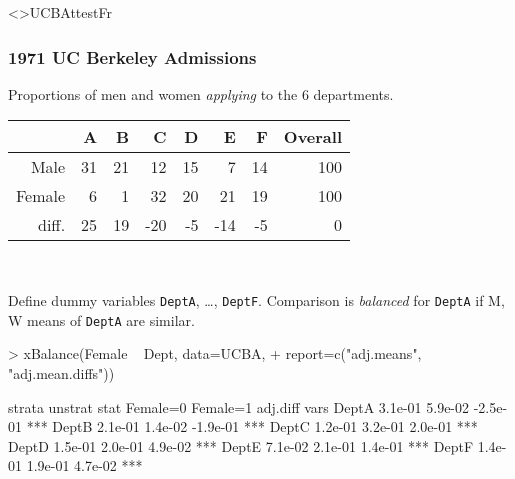 \againframe<\nottheirhandout>{UCBAttestFr}

\begin{frame}[fragile] 
  \frametitle{1971 UC Berkeley Admissions}

\bigskip

Proportions of men and women \textit{applying} to the 6 departments.\\
\begin{tabular}{rrrrrrrr}
  \hline
 & A & B & C & D & E & F & Overall \\ 
  \hline
Male & 31 & 21 & 12 & 15 & 7 & 14 & 100 \\ 
  Female & 6 & 1 & 32 & 20 & 21 & 19 & 100 \\ 
  diff. & 25 & 19 & -20 & -5 & -14 & -5 & 0 \\ 
   \hline
\end{tabular}\\
\bigskip

Define dummy variables \texttt{DeptA}, \ldots, \texttt{DeptF}. Comparison is \textit{balanced} for \texttt{DeptA} if M, W means of \texttt{DeptA} are similar.

{\small
\begin{Schunk}
\begin{Sinput}
> xBalance(Female ~ Dept, data=UCBA, 
+          report=c("adj.means", "adj.mean.diffs"))
\end{Sinput}
\begin{Soutput}
      strata  unstrat                           
      stat   Female=0 Female=1 adj.diff         
vars                                            
DeptA        3.1e-01  5.9e-02  -2.5e-01 ***     
DeptB        2.1e-01  1.4e-02  -1.9e-01 ***     
DeptC        1.2e-01  3.2e-01  2.0e-01  ***     
DeptD        1.5e-01  2.0e-01  4.9e-02  ***     
DeptE        7.1e-02  2.1e-01  1.4e-01  ***     
DeptF        1.4e-01  1.9e-01  4.7e-02  ***     
\end{Soutput}
\end{Schunk}
}

\vfill
\end{frame}

